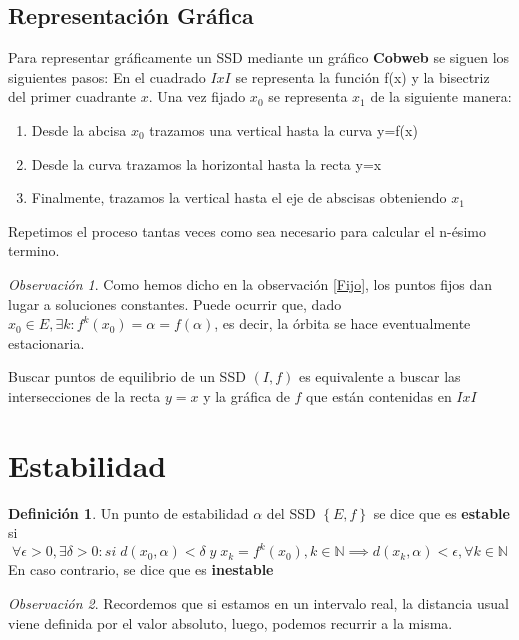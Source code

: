 \documentclass[a4paper, 12pt]{article}
\theoremstyle{plain}
\theoremstyle{definition}
\newtheorem{definicion}[teorema]{Definición}
\theoremstyle{remark}
\newtheorem*{observacion}{Observación}
\begin{document}
	\subsection{Representación Gráfica}
	Para representar gráficamente un SSD mediante un gráfico \textbf{Cobweb} se siguen los siguientes pasos:
	En el cuadrado $IxI$ se representa la función f(x) y la bisectriz del primer cuadrante $x$. Una vez fijado $x_0$ se representa $x_1$ de la siguiente manera:
	\begin{enumerate}
		\item Desde la abcisa $x_0$ trazamos una vertical hasta la curva y=f(x)
		\item Desde la curva trazamos la horizontal hasta la recta y=x
		\item Finalmente, trazamos la vertical hasta el eje de abscisas obteniendo $x_1$ 
	\end{enumerate}
	Repetimos el proceso tantas veces como sea necesario para calcular el n-ésimo termino.
	
	\begin{observacion}\label{Constante}
		Como hemos dicho en la observación \ref{Fijo}, los puntos fijos dan lugar a soluciones constantes. Puede ocurrir que, dado $x_0 \in E, \exists k : f^{k}(x_0) = \alpha = f(\alpha) $, es decir, la órbita se hace eventualmente estacionaria.
		
		\smallskip
		Buscar puntos de equilibrio de un SSD $(I,f)$ es equivalente a buscar las intersecciones de la recta $y=x$ y la gráfica de $f$ que están contenidas en $IxI$
	\end{observacion}

	\section{Estabilidad}
	\begin{definicion}\label{Estabilidad}
		Un punto de estabilidad $\alpha$ del SSD \(\left\{E,f \right\}\) se dice que es \textbf{estable} si \[\forall \epsilon > 0, \exists \delta > 0 : si\; d(x_0,\alpha) < \delta\; y\; x_k=f^k(x_0), k\in \mathbb{N} \implies d(x_k,\alpha) < \epsilon, \forall k\in \mathbb{N}\]
		En caso contrario, se dice que es \textbf{inestable}
	\end{definicion}

	\begin{observacion}
		Recordemos que si estamos en un intervalo real, la distancia usual viene definida por el valor absoluto, luego, podemos recurrir a la misma.
	\end{observacion}
\end{document}
